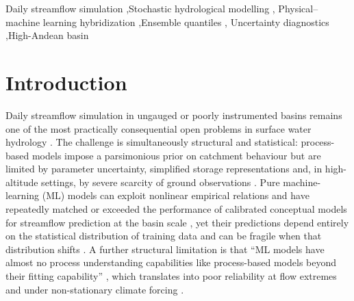 \documentclass[a4paper,fleqn]{cas-sc}
\begin{document}
\begin{keywords}
Daily streamflow simulation \sep Stochastic hydrological modelling \sep
Physical--machine learning hybridization \sep Ensemble quantiles \sep
Uncertainty diagnostics \sep High-Andean basin
\end{keywords}

\maketitle

\section{Introduction}\label{sec:introduction}

Daily streamflow simulation in ungauged or poorly instrumented basins
remains one of the most practically consequential open problems in
surface water hydrology \citep{razavi2013}. The challenge is
simultaneously structural and statistical: process-based models impose
a parsimonious prior on catchment behaviour but are limited by
parameter uncertainty, simplified storage representations and, in
high-altitude settings, by severe scarcity of ground observations
\citep{adnan2021comparison,nauditt2017}. Pure machine-learning (ML)
models can exploit nonlinear empirical relations and have repeatedly
matched or exceeded the performance of calibrated conceptual models for
streamflow prediction at the basin scale
\citep{arsenault2022,kratzert2019towards,lees2021}, yet their
predictions depend entirely on the statistical distribution of training
data and can be fragile when that distribution shifts
\citep{frame2021,zhong2023}. A further structural limitation is that
``ML models have almost no process understanding capabilities like
process-based models beyond their fitting capability''
\citep{li2024process}, which translates into poor reliability at flow
extremes and under non-stationary climate forcing \citep{zhong2023}.
\end{document}
